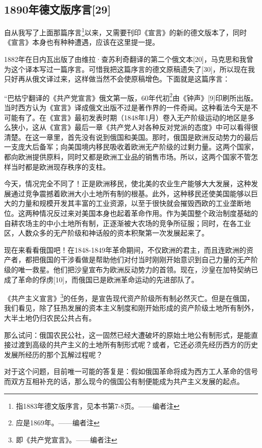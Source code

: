 \documentclass[UTF8,zihao=-4,a4paper]{ctexart}
\begin{document}
\subsection*{1890年德文版序言[29]}
自从我写了上面那篇序言\footnote{指1883年德文版序言，见本书第7-8页。——编者注}以来，又需要刊印《宣言》的新的德文版本了，同时《宣言》本身也有种种遭遇，应该在这里提一提。\par
1882年在日内瓦出版了由维拉·查苏利奇翻译的第二个俄文本[20]，马克思和我曾为这个译本写过一篇序言。可惜我把这篇序言的德文原稿遗失了[30]，所以现在我只好再从俄文译过来，这样做当然不会使原稿增色。下面就是这篇序言：\par
“巴枯宁翻译的《共产党宣言》俄文第一版，60年代初\footnote{应是1869年。——编者注}由《钟声》[9]印刷所出版。当时西方认为《宣言》译成俄文出版不过是著作界的一件奇闻。这种看法今天是不可能有了。在《宣言》最初发表时期（1848年1月）卷入无产阶级运动的地区是多么狭小，这从《宣言》最后一章《共产党人对各种反对党派的态度》中可以看得很清楚。在这一章里，首先没有说到俄国和美国。那时，俄国是欧洲反动势力的最后一支庞大后备军；向美国境内移民吸收着欧洲无产阶级的过剩力量。这两个国家，都向欧洲提供原料，同时又都是欧洲工业品的销售市场。所以，这两个国家不管怎样当时都是欧洲现存秩序的支柱。\par
今天，情况完全不同了！正是欧洲移民，使北美的农业生产能够大大发展，这种发展通过竞争震撼着欧洲大小土地所有制的根基。此外，这种移民还使美国能够以巨大的力量和规模开发其丰富的工业资源，以至于很快就会摧毁西欧的工业垄断地位。这两种情况反过来对美国本身也起着革命作用。作为美国整个政治制度基础的自耕农场主的中小土地所有制，正逐渐被大农场的竞争所征服；同时，在各工业区，人数众多的无产阶级和神话般的资本积聚第一次发展起来了。\par
现在来看看俄国吧！在1848-1849年革命期间，不仅欧洲的君主，而且连欧洲的资产者，都把俄国的干涉看做是帮助他们对付当时刚刚开始意识到自己力量的无产阶级的唯一救星。他们把沙皇宣布为欧洲反动势力的首领。现在，沙皇在加特契纳已成了革命的俘虏[10]，而俄国已是欧洲革命运动的先进部队了。\par
《共产主义宣言》\footnote{即《共产党宣言》。——编者注}的任务，是宣告现代资产阶级所有制必然灭亡。但是在俄国，我们看见，除了狂热发展的资本主义制度和刚开始形成的资产阶级土地所有制外，大半土地仍归农民公共占有。\par
那么试问：俄国农民公社，这一固然已经大遭破坏的原始土地公有制形式，是能直接过渡到高级的共产主义的土地所有制形式呢？或者，它还必须先经历西方的历史发展所经历的那个瓦解过程呢？\par
对于这个问题，目前唯一可能的答复是：假如俄国革命将成为西方工人革命的信号而双方互相补充的话，那么现今的俄国公有制便能成为共产主义发展的起点。\par
\end{document}
